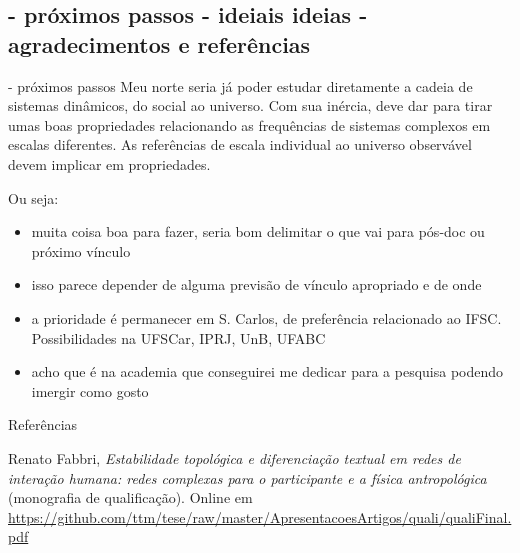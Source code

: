 \documentclass[10pt]{beamer}
\begin{document}
\subsection{- próximos passos \;\; - ideiais ideias \;\; - agradecimentos e referências}
\begin{frame}{- próximos passos}
Meu norte seria já poder estudar diretamente a cadeia de sistemas dinâmicos, do social ao universo. Com sua inércia, deve dar para tirar umas boas propriedades relacionando as frequências de sistemas complexos em escalas diferentes. As referências de escala individual ao universo observável devem implicar em propriedades.

Ou seja:
	\begin{itemize}
		\item muita coisa boa para fazer, seria bom delimitar o que vai para pós-doc ou próximo vínculo
		\item isso parece depender de alguma previsão de vínculo apropriado e de onde
		\item a prioridade é permanecer em S. Carlos, de preferência relacionado ao IFSC. Possibilidades na UFSCar, IPRJ, UnB, UFABC
		\item acho que é na academia que conseguirei me dedicar para a pesquisa podendo imergir como gosto
	\end{itemize}
\end{frame}



\begin{frame}{Referências}
  \begin{thebibliography}{99}
	  Renato Fabbri, \emph{Estabilidade topológica e diferenciação textual em redes de interação humana: redes complexas para o participante e a física antropológica} (monografia de qualificação). Online em
	  \url{https://github.com/ttm/tese/raw/master/ApresentacoesArtigos/quali/qualiFinal.pdf}
  \end{thebibliography}
\end{frame}

\begin{frame}
\Large
\begin{center}
\end{center}
\end{frame}
\end{document}
